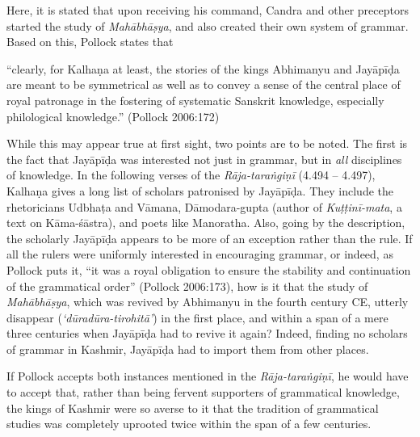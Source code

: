 Here, it is stated that upon receiving his command, Candra and other preceptors started the study of {\sl Mahābhāṣya}, and also created their own system of grammar. Based on this, Pollock states that 
\begin{myquote}
``clearly, for Kalhaṇa  at least, the stories of the kings Abhimanyu and Jayāpīḍa are meant to be symmetrical as well as to convey a sense of the central place of royal patronage in the fostering of systematic Sanskrit knowledge, especially philological knowledge.''
\hfill (Pollock 2006:172)
\end{myquote}
While this may appear true at first sight, two points are to be noted. The first is the fact that Jayāpīḍa was interested not just in grammar, but in {\sl all} disciplines of knowledge. In the following verses of the {\sl Rāja-taraṅgiṇī} (4.494 -- 4.497), Kalhaṇa gives a long list of scholars patronised by Jayāpīḍa. They include the rhetoricians Udbhaṭa and Vāmana, Dāmodara-gupta (author of {\sl Kuṭṭinī-mata}, a text on Kāma-śāstra), and poets like Manoratha. Also, going by the description, the scholarly Jayāpīḍa appears to be more of an exception rather than the rule. If all the rulers were uniformly interested in encouraging grammar, or indeed, as Pollock puts it, ``it was a royal obligation to ensure the stability and continuation of the grammatical order'' (Pollock 2006:173), how is it that the study of {\sl Mahābhāṣya}, which was revived by Abhimanyu in the fourth century CE, utterly disappear ({\sl `dūradūra-tirohitā'}) in the first place, and within a span of a mere three centuries when Jayāpīḍa had to revive it again? Indeed, finding no scholars of grammar in Kashmir, Jayāpīḍa had to import them from other places. 

If Pollock accepts both instances mentioned in the {\sl Rāja-taraṅgiṇī}, he would have to accept that, rather than being fervent supporters of grammatical knowledge, the kings of Kashmir were so averse to it that the tradition of grammatical studies was completely uprooted twice within the span of a few centuries.\\[-17pt]

